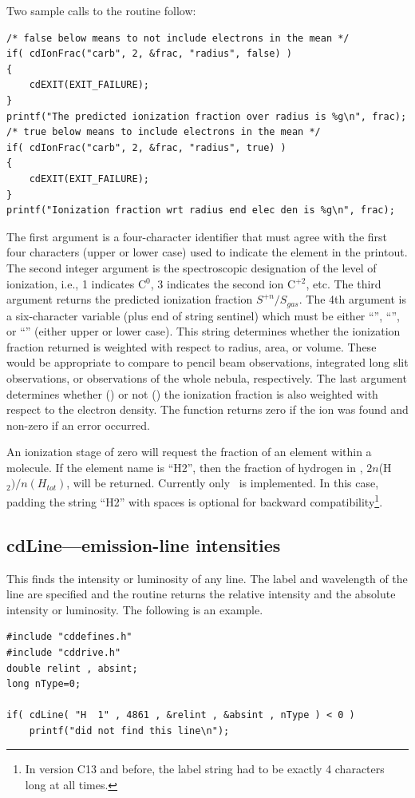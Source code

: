 Two sample calls to the routine follow:
\begin{verbatim}
/* false below means to not include electrons in the mean */
if( cdIonFrac("carb", 2, &frac, "radius", false) )
{
    cdEXIT(EXIT_FAILURE);
}
printf("The predicted ionization fraction over radius is %g\n", frac);
/* true below means to include electrons in the mean */
if( cdIonFrac("carb", 2, &frac, "radius", true) )
{
    cdEXIT(EXIT_FAILURE);
}
printf("Ionization fraction wrt radius end elec den is %g\n", frac);
\end{verbatim}
The first argument is a four-character identifier that must agree with the
first four characters (upper or lower case) used to indicate the element
in the printout.  The second integer argument is the spectroscopic
designation of the level of ionization, i.e., 1 indicates C$^0$,
3 indicates the second ion C$^{+2}$, etc.
The third argument returns the predicted ionization
fraction $S^{+n}/S_{gas}$.
The 4th argument is a six-character variable (plus end
of string sentinel) which must be either ``'', ``'', or
``'' (either
upper or lower case).
This string determines whether the ionization fraction
returned is weighted with respect to radius, area, or volume.
These would be appropriate to compare to pencil beam observations,
integrated long slit observations, or observations of the whole nebula, respectively.
The last argument
determines whether () or not ()
the ionization fraction is also
weighted with respect to the electron density.
The function returns zero
if the ion was found and non-zero if an error occurred.

An ionization stage of zero will request the fraction of an element
within a molecule.
If the element name is ``H2'', then the fraction of hydrogen in \htwo,
$2n$(H$_2)/n(H_{tot})$, will
be returned.  Currently only \htwo\ is implemented.
In this case, padding the
string ``H2'' with spaces is optional for backward compatibility\footnote{In
  version C13 and before, the label string had to be exactly 4 characters
  long at all times.}.

\subsection{cdLine---emission-line intensities }

This finds the intensity or luminosity of any line.  The label and
wavelength of the line are specified and the routine returns the relative
intensity and the absolute intensity or luminosity.
The following is an example.
\begin{verbatim}
#include "cddefines.h"
#include "cddrive.h"
double relint , absint;
long nType=0;

if( cdLine( "H  1" , 4861 , &relint , &absint , nType ) < 0 )
    printf("did not find this line\n");
\end{verbatim}


